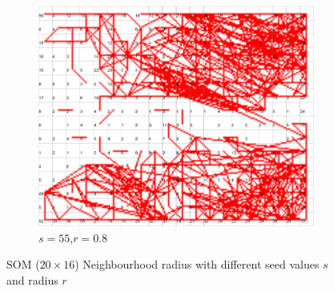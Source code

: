\documentclass{acm_proc_article-sp}
\begin{document}
\begin{figure}
\begin{subfigure}[b]{0.30\linewidth}
        \label{fig:wine-newmid-radius-neighbourhood-graph--r-08-seed-7}
    \end{subfigure}
    \begin{subfigure}[b]{0.30\linewidth}
        \includegraphics[width=\linewidth]{img/wine-newmid-radius-neighbourhood-graph--r-08-seed-55}
        \caption{$s=55$,$r=0.8$}
        \label{fig:wine-newmid-radius-neighbourhood-graph--r-08-seed-55}
    \end{subfigure}
    \caption{SOM ($20\times16$) Neighbourhood radius with different seed values $s$ and radius $r$}
    \label{fig:wine-newmid-radius-neighbourhood-graph--r-08-seed}
\end{figure}
\end{document}
